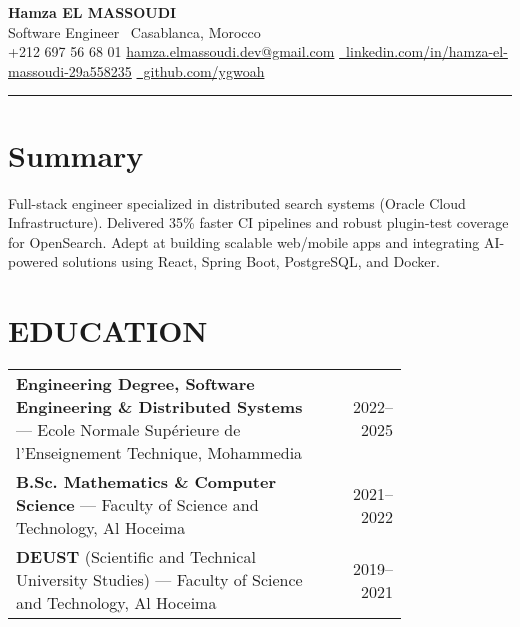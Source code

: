 \documentclass[10pt,a4paper]{article}
\begin{document}
\begin{center}
    {\LARGE \textbf{Hamza EL MASSOUDI}}\\
    \smallskip
    Software Engineer \textbar\ Casablanca, Morocco\\
    \smallskip
    \faPhone\; +212 697 56 68 01 \quad
    \href{mailto:hamza.elmassoudi.dev@gmail.com}{hamza.elmassoudi.dev@gmail.com} \quad
    \href{https://www.linkedin.com/in/hamza-el-massoudi-29a558235/}{\faLinkedin\ linkedin.com/in/hamza-el-massoudi-29a558235} \quad
    \href{https://github.com/ygwoah/}{\faGithub\ github.com/ygwoah}
\end{center}
\vspace{-4pt}
\hrule
\vspace{8pt}

\section*{Summary}
Full-stack engineer specialized in distributed search systems (Oracle Cloud Infrastructure). Delivered 35\% faster CI pipelines and robust plugin-test coverage for OpenSearch. Adept at building scalable web/mobile apps and integrating AI-powered solutions using React, Spring Boot, PostgreSQL, and Docker.

\section{EDUCATION}

\begin{tabularx}{\linewidth}{@{}p{0.78\linewidth} r@{}}
	\textbf{Engineering Degree, Software Engineering \& Distributed Systems} — Ecole Normale Supérieure de l’Enseignement Technique, Mohammedia & 2022--2025 \\
	\textbf{B.Sc. Mathematics \& Computer Science} — Faculty of Science and Technology, Al Hoceima & 2021--2022 \\
	\textbf{DEUST} (Scientific and Technical University Studies) — Faculty of Science and Technology, Al Hoceima & 2019--2021 \\
\end{tabularx}

\end{document}
